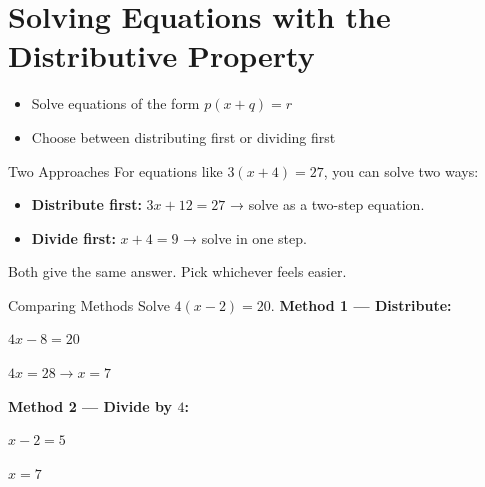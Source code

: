 \section{Solving Equations with the Distributive Property}

\begin{learningGoals}
\begin{itemize}
    \item Solve equations of the form $p(x + q) = r$
    \item Choose between distributing first or dividing first
\end{itemize}
\end{learningGoals}

\begin{conceptBox}{Two Approaches}
For equations like $3(x + 4) = 27$, you can solve two ways:
\begin{itemize}[leftmargin=*]
    \item \textbf{Distribute first:} $3x + 12 = 27$ → solve as a two-step equation.
    \item \textbf{Divide first:} $x + 4 = 9$ → solve in one step.
\end{itemize}
Both give the same answer. Pick whichever feels easier.
\end{conceptBox}

\begin{sideBySideExample}{Comparing Methods}
Solve $4(x - 2) = 20$.
\tcblower
\textbf{Method 1 — Distribute:}

$4x - 8 = 20$

$4x = 28 \to x = 7$

\textbf{Method 2 — Divide by $4$:}

$x - 2 = 5$

$x = 7$ \checkmark
\end{sideBySideExample}


